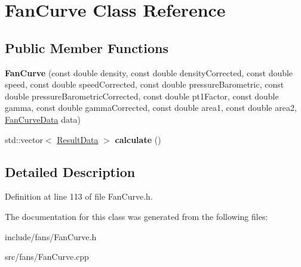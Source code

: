 \hypertarget{class_fan_curve}{}\section{Fan\+Curve Class Reference}
\label{class_fan_curve}
\subsection*{Public Member Functions}
\begin{DoxyCompactItemize}
\item 
\mbox{\label{class_fan_curve_aadde731da2ac3cd6a924e6d23454f3f7}} 
{\bfseries Fan\+Curve} (const double density, const double density\+Corrected, const double speed, const double speed\+Corrected, const double pressure\+Barometric, const double pressure\+Barometric\+Corrected, const double pt1\+Factor, const double gamma, const double gamma\+Corrected, const double area1, const double area2, \hyperlink{class_fan_curve_data}{Fan\+Curve\+Data} data)
\item 
\mbox{\label{class_fan_curve_acd1ec595f476b74718479bbb66e778ec}} 
std\+::vector$<$ \hyperlink{class_result_data}{Result\+Data} $>$ {\bfseries calculate} ()
\end{DoxyCompactItemize}


\subsection{Detailed Description}


Definition at line 113 of file Fan\+Curve.\+h.



The documentation for this class was generated from the following files\+:\begin{DoxyCompactItemize}
\item 
include/fans/Fan\+Curve.\+h\item 
src/fans/Fan\+Curve.\+cpp\end{DoxyCompactItemize}
